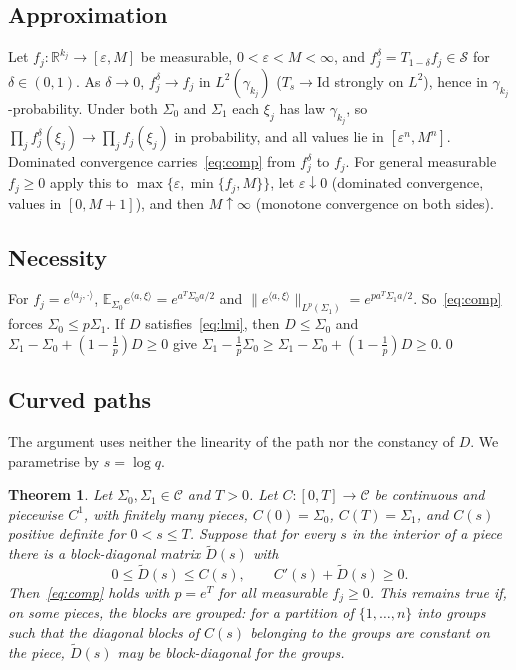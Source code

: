 \documentclass[11pt]{amsart}
\newtheorem{theorem}{Theorem}[section]
\theoremstyle{definition}
\newcommand{\E}{\mathbb{E}}
\newcommand{\R}{\mathbb{R}}
\newcommand{\cS}{\mathcal{S}}
\newcommand{\Id}{\mathrm{Id}}
\begin{document}
\subsection{Approximation}\label{sec:approx}
Let $f_j:\R^{k_j}\to[\varepsilon,M]$ be measurable, $0<\varepsilon<M<\infty$, and $f_j^\delta=T_{1-\delta}f_j\in\cS$ for
$\delta\in(0,1)$. As $\delta\to0$, $f_j^\delta\to f_j$ in $L^2(\gamma_{k_j})$ ($T_s\to\Id$ strongly on $L^2$), hence in
$\gamma_{k_j}$-probability. Under both $\Sigma_0$ and $\Sigma_1$ each $\xi_j$ has law $\gamma_{k_j}$, so
$\prod_jf_j^\delta(\xi_j)\to\prod_jf_j(\xi_j)$ in probability, and all values lie in $[\varepsilon^n,M^n]$. Dominated
convergence carries~\eqref{eq:comp} from $f_j^\delta$ to $f_j$. For general measurable $f_j\ge0$ apply this to
$\max\{\varepsilon,\min\{f_j,M\}\}$, let $\varepsilon\downarrow0$ (dominated convergence, values in $[0,M+1]$), and
then $M\uparrow\infty$ (monotone convergence on both sides).

\subsection{Necessity}
For $f_j=e^{\langle a_j,\cdot\rangle}$, $\E_{\Sigma_0}e^{\langle a,\xi\rangle}=e^{a^T\Sigma_0a/2}$ and
$\|e^{\langle a,\xi\rangle}\|_{L^p(\Sigma_1)}=e^{pa^T\Sigma_1a/2}$. So~\eqref{eq:comp} forces $\Sigma_0\le p\Sigma_1$.
If $D$ satisfies~\eqref{eq:lmi}, then $D\le\Sigma_0$ and $\Sigma_1-\Sigma_0+(1-\frac1p)D\ge0$ give
$\Sigma_1-\frac1p\Sigma_0\ge\Sigma_1-\Sigma_0+(1-\frac1p)D\ge0$.\qed

\subsection{Curved paths}\label{sec:paths}
The argument uses neither the linearity of the path nor the constancy of $D$. We parametrise by $s=\log q$.

\begin{theorem}\label{thm:path}
Let $\Sigma_0,\Sigma_1\in\mathcal C$ and $T>0$. Let $C:[0,T]\to\mathcal C$ be continuous and piecewise $C^1$, with
finitely many pieces, $C(0)=\Sigma_0$, $C(T)=\Sigma_1$, and $C(s)$ positive definite for $0<s\le T$. Suppose that
for every $s$ in the interior of a piece there is a block-diagonal matrix $\tilde D(s)$ with
\begin{equation}\label{eq:pathcond}
0\le\tilde D(s)\le C(s),\qquad C'(s)+\tilde D(s)\ge0 .
\end{equation}
Then~\eqref{eq:comp} holds with $p=e^T$ for all measurable $f_j\ge0$. This remains true if, on some pieces, the
blocks are grouped: for a partition of $\{1,\dots,n\}$ into groups such that the diagonal blocks of $C(s)$ belonging to
the groups are constant on the piece, $\tilde D(s)$ may be block-diagonal for the groups.
\end{theorem}
\end{document}
